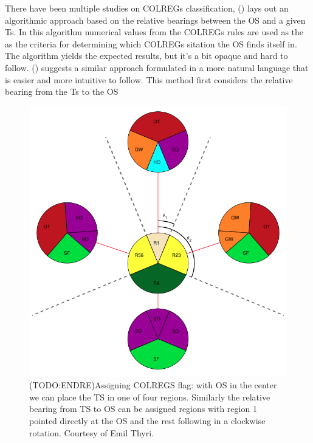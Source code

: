 There have been multiple studies on \gls{COLREGs} classification, (\cite{woerner2016multi}) lays out an algorithmic approach based on the
relative bearings between the \gls{OS} and a given \gls{Ts}. In this algorithm numerical values from the \gls{COLREGs} rules are used as the
as the criteria for determining which \gls{COLREGs} sitation the \gls{OS} finds itself in. The algorithm yields the expected results,
but it's a bit opaque and hard to follow. (\cite{tam2010collision}) suggests a similar approach formulated in a more natural language that is easier
and more intuitive to follow. This method first considers the relative bearing from the \gls{Ts} to the \gls{OS}


\begin{figure} %
    \centering
    \includegraphics[height=0.5\textheight]{Images/COLREGs_assess.png}
    \caption{(TODO:ENDRE)Assigning COLREGS flag: with OS in the center we can place the TS in one of four regions. Similarly the relative bearing from TS to OS can be assigned regions with region 1 pointed directly at the OS and the rest following in a clockwise rotation.
    Courtesy of Emil Thyri.}
    \label{FIG: COLREGs Classification}
\end{figure}

